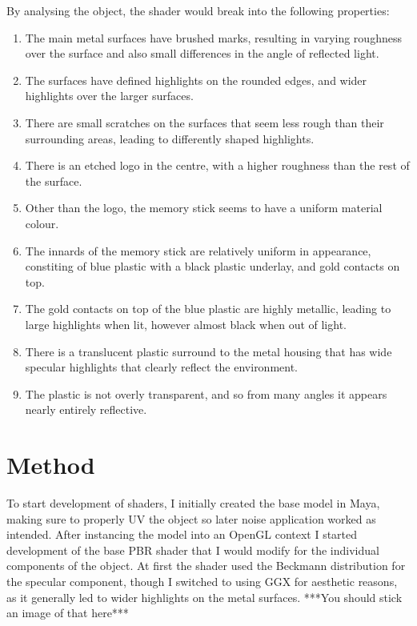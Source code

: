 \documentclass[]{acmsiggraph}
\begin{document}
By analysing the object, the shader would break into the following properties:
\begin{enumerate}    
    \item The main metal surfaces have brushed marks, resulting in varying roughness over the surface and also small differences in the angle of reflected light.
    \item The surfaces have defined highlights on the rounded edges, and wider highlights over the larger surfaces.
    \item There are small scratches on the surfaces that seem less rough than their surrounding areas, leading to differently shaped highlights.
    \item There is an etched logo in the centre, with a higher roughness than the rest of the surface.
    \item Other than the logo, the memory stick seems to have a uniform material colour.
    \item The innards of the memory stick are relatively uniform in appearance, constiting of blue plastic with a black plastic underlay, and gold contacts on top.
    \item The gold contacts on top of the blue plastic are highly metallic, leading to large highlights when lit, however almost black when out of light.
    \item There is a translucent plastic surround to the metal housing that has wide specular highlights that clearly reflect the environment.
    \item The plastic is not overly transparent, and so from many angles it appears nearly entirely reflective.
\end{enumerate}

\section{Method} \label{sec:Method}
To start development of shaders, I initially created the base model in Maya, making sure to properly UV the object so later noise application worked as intended.  After instancing the model into 
an OpenGL context I started development of the base PBR shader that I would modify for the individual components of the object.  At first the shader used the Beckmann distribution for the specular 
component, though I switched to using GGX for aesthetic reasons, as it generally led to wider highlights on the metal surfaces. ***You should stick an image of that here***
\end{document}
